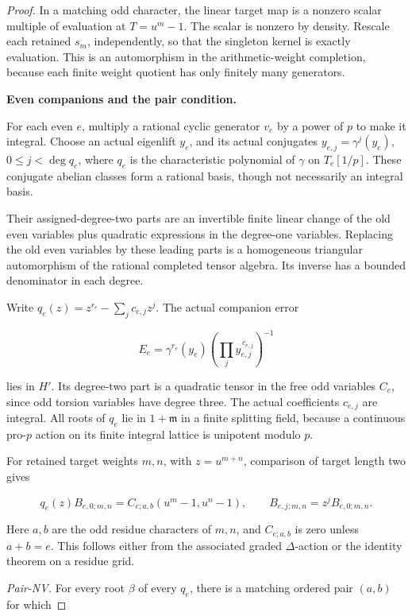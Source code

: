 \begin{proof}
In a matching odd character, the linear target map is a nonzero scalar multiple of evaluation at \(T=u^m-1\). The scalar is nonzero by density. Rescale each retained \(s_m\), independently, so that the singleton kernel is exactly evaluation. This is an automorphism in the arithmetic-weight completion, because each finite weight quotient has only finitely many generators.

\par\medskip\noindent\textbf{Even companions and the pair condition.}

For each even \(e\), multiply a rational cyclic generator \(v_e\) by a power of \(p\) to make it integral. Choose an actual eigenlift \(y_e\), and its actual conjugates \(y_{e,j}=\gamma^j(y_e)\), \(0\le j<\deg q_e\), where \(q_e\) is the characteristic polynomial of \(\gamma\) on \(T_e[1/p]\). These conjugate abelian classes form a rational basis, though not necessarily an integral basis.

Their assigned-degree-two parts are an invertible finite linear change of the old even variables plus quadratic expressions in the degree-one variables. Replacing the old even variables by these leading parts is a homogeneous triangular automorphism of the rational completed tensor algebra. Its inverse has a bounded denominator in each degree.

Write \(q_e(z)=z^{r_e}-\sum_j c_{e,j}z^j\). The actual companion error

\[
E_e=\gamma^{r_e}(y_e)
       \left(\prod_j y_{e,j}^{\,c_{e,j}}\right)^{-1}
\]

lies in \(H'\). Its degree-two part is a quadratic tensor in the free odd variables \(C_e\), since odd torsion variables have degree three. The actual coefficients \(c_{e,j}\) are integral. All roots of \(q_e\) lie in \(1+\mathfrak m\) in a finite splitting field, because a continuous pro-\(p\) action on its finite integral lattice is unipotent modulo \(p\).

For retained target weights \(m,n\), with \(z=u^{m+n}\), comparison of target length two gives

\[
q_e(z)B_{e,0;m,n}
  =C_{e;a,b}(u^m-1,u^n-1),\qquad B_{e,j;m,n}=z^jB_{e,0;m,n}.
\]

Here \(a,b\) are the odd residue characters of \(m,n\), and \(C_{e;a,b}\) is zero unless \(a+b=e\). This follows either from the associated graded \(\Delta\)-action or the identity theorem on a residue grid.

\emph{Pair-NV.} For every root \(\beta\) of every \(q_e\), there is a matching ordered pair \((a,b)\) for which


\end{proof}
